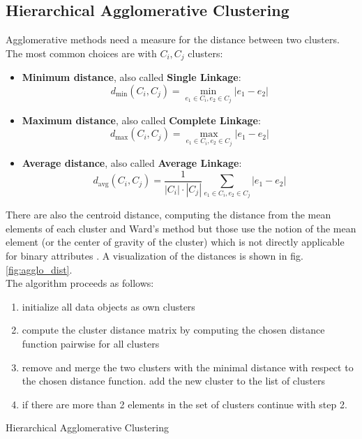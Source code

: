 \subsection{Hierarchical Agglomerative Clustering}\label{\positionnumber}
Agglomerative methods need a measure for the distance between two clusters. The most common choices are with $C_i, C_j$ clusters:
\begin{itemize}
    \item \textbf{Minimum distance}, also called \textbf{Single Linkage}: 
    \[d_{\text{min}}(C_i, C_j) = \min_{e_1 \in C_i, e_2 \in C_j} |e_1 - e_2|\]
    \item \textbf{Maximum distance}, also called \textbf{Complete Linkage}: 
    \[d_{\text{max}}(C_i, C_j) = \max_{e_1 \in C_i, e_2 \in C_j} |e_1 - e_2|\]
    \item \textbf{Average distance}, also called \textbf{Average Linkage}: 
    \[d_{\text{avg}}(C_i, C_j) = \frac{1}{|C_i| \cdot |C_j|} \sum_{e_1 \in C_i, e_2 \in C_j} |e_1 - e_2|\]
\end{itemize}
There are also the centroid distance, computing the distance from the mean elements of each cluster and Ward's method but those use the notion of the mean element (or the center of gravity of the cluster) which is not directly applicable for binary attributes \cite{mirkin2013mathematical, han2011data}. A visualization of the distances is shown in fig. \ref{fig:agglo_dist}.
 \\
The algorithm proceeds as follows: 
\begin{enumerate}
    \item initialize all data objects as own clusters
    \item compute the cluster distance matrix by computing the chosen distance function pairwise for all clusters
    \item remove and merge the two clusters with the minimal distance with respect to the chosen distance function. add the new cluster to the list of clusters
    \item if there are more than 2 elements in the set of clusters continue with step 2. 
\end{enumerate}
\begin{algorithm}[htp]
\caption{Hierarchical Agglomerative Clustering}\label{agglo}
\end{algorithm}

